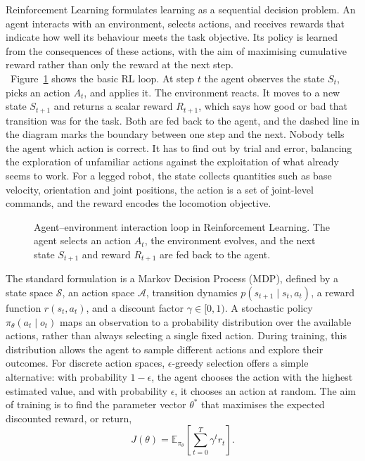 Reinforcement Learning formulates learning as a sequential decision problem.
An agent interacts with an environment, selects actions, and receives rewards
that indicate how well its behaviour meets the task objective. Its policy is
learned from the consequences of these actions, with the aim of maximising
cumulative reward rather than only the reward at the next step.\\
\
Figure~\ref{fig:rl_loop} shows the basic RL loop. At step \(t\) the agent
observes the state \(S_t\), picks an action \(A_t\), and applies it. The
environment reacts. It moves to a new state \(S_{t+1}\) and returns a scalar
reward \(R_{t+1}\), which says how good or bad that transition was for the
task. Both are fed back to the agent, and the dashed line in the diagram marks
the boundary between one step and the next. Nobody tells the agent which action is correct. It has to find out by
trial and error, balancing the exploration of unfamiliar actions against the
exploitation of what already seems to work. For a legged robot, the state collects quantities such as
base velocity, orientation and joint positions, the action is a set of
joint-level commands, and the reward encodes the locomotion objective.
%
\begin{figure}[H]
    \centering
    
    \caption{Agent--environment interaction loop in Reinforcement Learning.
    The agent selects an action \(A_t\), the environment evolves, and the
    next state \(S_{t+1}\) and reward \(R_{t+1}\) are fed back to the agent.}
    \label{fig:rl_loop}
\end{figure}
%
\noindent The standard formulation is a Markov Decision Process (MDP), defined by a state
space \(\mathcal{S}\), an action space \(\mathcal{A}\), transition dynamics
\(p(s_{t+1} \mid s_t, a_t)\), a reward function \(r(s_t,a_t)\), and a
discount factor \(\gamma \in [0,1)\). A stochastic policy
\(\pi_\theta(a_t \mid o_t)\) maps an observation to a probability
distribution over the available actions, rather than always selecting a
single fixed action. During training, this distribution allows the agent to
sample different actions and explore their outcomes. For discrete action
spaces, \(\epsilon\)-greedy selection offers a simple alternative: with
probability \(1-\epsilon\), the agent chooses the action with the highest
estimated value, and with probability \(\epsilon\), it chooses an action at
random. The aim of training is to find the parameter vector \(\theta^*\) that
maximises the expected discounted reward, or return,
%
\begin{equation}
    J(\theta) =
    \mathbb{E}_{\pi_\theta}
    \left[
        \sum_{t=0}^{T} \gamma^{t} r_t
    \right].
    \label{eq:rl_return}
\end{equation}
